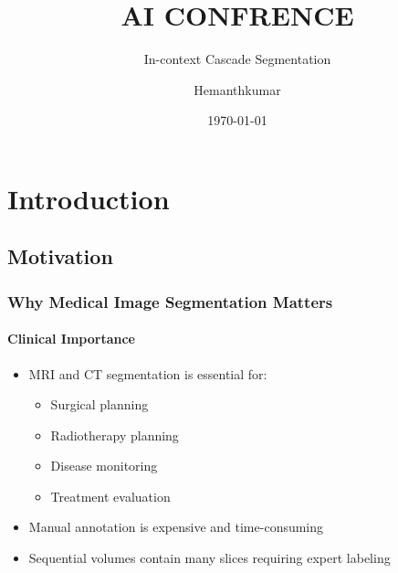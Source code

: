 \documentclass[nometaot,lecture,amberg,autotoc,toc=twocolumn,indicatelastpageofframe,footlinebox]{OTHAWbeamer}
\title{AI CONFRENCE}
\subtitle{In-context Cascade Segmentation }
\author{Hemanthkumar}
\date{\today}
\begin{document}
\maketitle

\inserttoc


\section{Introduction}

\subsection{Motivation}

\begin{frame}
    \frametitle{Why Medical Image Segmentation Matters}
    \framesubtitle{Clinical Importance}

    \begin{itemize}
        \item MRI and CT segmentation is essential for:
        \begin{itemize}
            \item Surgical planning
            \item Radiotherapy planning
            \item Disease monitoring
            \item Treatment evaluation
        \end{itemize}

        \vspace{0.5em}

        \item Manual annotation is expensive and time-consuming

        \item Sequential volumes contain many slices requiring expert labeling
    \end{itemize}

    \vspace{1em}


\end{frame}
\end{document}
